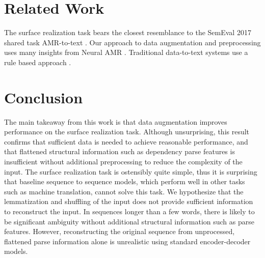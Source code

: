 \documentclass[11pt,a4paper]{article}
\begin{document}
\section{Related Work}

The surface realization task bears the closest resemblance to the SemEval 2017 shared task AMR-to-text \citep{May2017}. Our approach to data augmentation and preprocessing uses many insights from Neural AMR \citep{Konstas2017NeuralGeneration}. Traditional data-to-text systems use a rule based approach \citep{Reiter:2000:BNL:331955}.





\section{Conclusion}

The main takeaway from this work is that data augmentation improves performance on the surface realization task. Although unsurprising, this result confirms that sufficient data is needed to achieve reasonable performance, and that flattened structural information such as dependency parse features is insufficient without additional preprocessing to reduce the complexity of the input. The surface realization task is ostensibly quite simple, thus it is surprising that baseline sequence to sequence models, which perform well in other tasks such as machine translation, cannot solve this task. We hypothesize that the lemmatization and shuffling of the input does not provide sufficient information to reconstruct the input. In sequences longer than a few words, there is likely to be significant ambiguity without additional structural information such as parse features. However, reconstructing the original sequence from unprocessed, flattened parse information alone is unrealistic using standard encoder-decoder models. 
\end{document}
